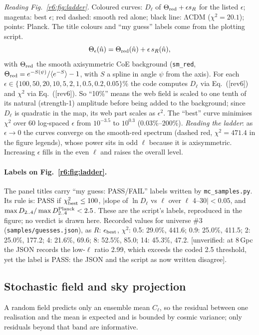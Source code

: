 \documentclass[11pt]{article}
\newcommand{\flag}[1]{\textsf{[unverified: #1]}}
\begin{document}
\noindent\emph{Reading Fig.~\ref{r6:fig:ladder}.} Coloured curves: $D_\ell$ of $\Theta_{\rm red}+\epsilon s_R$ for the listed $\epsilon$; magenta: best $\epsilon$; red dashed: smooth red alone; black line: ΛCDM ($\chi^2=20.1$); points: Planck. The title colours and ``my guess'' labels come from the plotting script.
\begin{equation}\label{r6:eq14}
\Theta_\epsilon(\hat n)=\Theta_{\rm red}(\hat n)+\epsilon\,s_R(\hat n),
\end{equation}
with $\Theta_{\rm red}$ the smooth axisymmetric CoE background (\texttt{sm\_red}, $\Theta_{\rm red}=e^{-S(\psi)}/\langle e^{-S}\rangle-1$, with $S$ a spline in angle $\psi$ from the axis). For each $\epsilon\in\{100,50,20,10,5,2,1,0.5,0.2,0.05\}\%$ the code computes $D_\ell$ via Eq.~([rev6]) and $\chi^2$ via Eq.~([rev6]). So ``10\%'' means the web field is scaled to one tenth of its natural (strength-1) amplitude before being added to the background; since $D_\ell$ is quadratic in the map, its web part scales as $\epsilon^2$. The ``best'' curve minimises $\chi^2$ over 60 log-spaced $\epsilon$ from $10^{-3.5}$ to $10^{0.3}$ (0.03\%--200\%). \emph{Reading the ladder}: as $\epsilon\to0$ the curves converge on the smooth-red spectrum (dashed red, $\chi^2=471.4$ in the figure legends), whose power sits in odd $\ell$ because it is axisymmetric. Increasing $\epsilon$ fills in the even $\ell$ and raises the overall level.

\paragraph{Labels on Fig.~\ref{r6:fig:ladder}.} The panel titles carry ``my guess: PASS/FAIL'' labels written by \texttt{mc\_samples.py}. Its rule is: PASS if $\chi^2_{\rm best}\le100$, $|$slope of $\ln D_\ell$ vs $\ell$ over $\ell$ 4--30$|<0.05$, and $\max D_{2..4}/\max D^{\rm Planck}_{2..4}<2.5$. These are the script's labels, reproduced in the figure; no verdict is drawn here. Recorded values for universe \#3 (\texttt{samples/guesses.json}), as $R$: $\epsilon_{\rm best}$, $\chi^2$: 0.5: 29.0\%, 441.6; 0.9: 25.0\%, 411.5; 2: 25.0\%, 177.2; 4: 21.6\%, 69.6; 8: 52.5\%, 85.0; 14: 45.3\%, 47.2. \flag{at 8\,Gpc the JSON records the low-$\ell$ ratio 2.99, which exceeds the coded 2.5 threshold, yet the label is PASS: the JSON and the script as now written disagree}.

\subsection{Stochastic field and sky projection}\label{r6:sec:field}
A random field predicts only an ensemble mean $C_\ell$, so the residual between one realisation and the mean is expected and is bounded by cosmic variance; only residuals beyond that band are informative.
\end{document}
